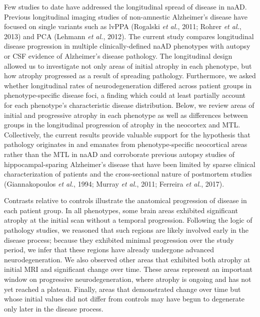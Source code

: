 \documentclass[]{article}
\begin{document}
Few studies to date have addressed the longitudinal spread of disease in
naAD. Previous longitudinal imaging studies of non-amnestic Alzheimer's
disease have focused on single variants such as lvPPA (Rogalski \emph{et
al.}, 2011; Rohrer \emph{et al.}, 2013) and PCA (Lehmann \emph{et al.},
2012). The current study compares longitudinal disease progression in
multiple clinically-defined naAD phenotypes with autopsy or CSF evidence
of Alzheimer's disease pathology. The longitudinal design allowed us to
investigate not only areas of initial atrophy in each phenotype, but how
atrophy progressed as a result of spreading pathology. Furthermore, we
asked whether longitudinal rates of neurodegeneration differed across
patient groups in phenotype-specific disease foci, a finding which could
at least partially account for each phenotype's characteristic disease
distribution. Below, we review areas of initial and progressive atrophy
in each phenotype as well as differences between groups in the
longitudinal progression of atrophy in the neocortex and MTL.
Collectively, the current results provide valuable support for the
hypothesis that pathology originates in and emanates from
phenotype-specific neocortical areas rather than the MTL in naAD and
corroborate previous autopsy studies of hippocampal-sparing Alzheimer's
disease that have been limited by sparse clinical characterization of
patients and the cross-sectional nature of postmortem studies
(Giannakopoulos \emph{et al.}, 1994; Murray \emph{et al.}, 2011;
Ferreira \emph{et al.}, 2017).

Contrasts relative to controls illustrate the anatomical progression of
disease in each patient group. In all phenotypes, some brain areas
exhibited significant atrophy at the initial scan without a temporal
progression. Following the logic of pathology studies, we reasoned that
such regions are likely involved early in the disease process; because
they exhibited minimal progression over the study period, we infer that
these regions have already undergone advanced neurodegeneration. We also
observed other areas that exhibited both atrophy at initial MRI and
significant change over time. These areas represent an important window
on progressive neurodegeneration, where atrophy is ongoing and has not
yet reached a plateau. Finally, areas that demonstrated change over time
but whose initial values did not differ from controls may have begun to
degenerate only later in the disease process.
\end{document}
